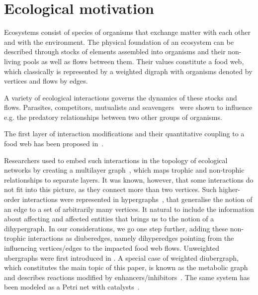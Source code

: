 \documentclass[a4paper,12pt]{article}
\theoremstyle{definition}
\theoremstyle{remark}
\newcommand{\mat}[1]{\todo[inline,color=cMat]{\color{black}#1}}
\newcommand{\adel}[2][]{\deleted[id=Alex,comment=#1]{#2}}
\newcommand{\gadd}[2][]{\added[id=Gokhan,comment=#1]{#2}}
\newcommand{\gdel}[2][]{\deleted[id=Gokhan,comment=#1]{#2}}
\begin{document}
\section{Ecological motivation}


Ecosystems consist of species of organisms that exchange matter with each other and with the environment. The physical foundation of an ecosystem can be described through stocks of elements assembled into organisms and their non-living pools\gadd{,} as well as flows between them. Their values constitute a food web, which classically is represented by a weighted digraph with organisms denoted by vertices and flows by edges. 

A variety of ecological interactions governs the dynamics of these stocks and flows. Parasites, competitors, mutualists\gadd{,} and scavengers~\cite{Moleon_scavenging} were shown to influence e.g.\gadd{,} the predatory relationships between two other groups of organisms. 

The first layer of interaction modifications and their quantitative coupling to a  food web has been proposed in~\cite{Goudard_nontrophic_2008}.

Researchers used to embed such interactions in the topology of ecological networks by creating a multilayer graph~\cite{Pilosof_2015, Lurgi_2020, Hutchinson2019}, which maps trophic and non-trophic relationships to separate layers. It was known, however, that some interactions do not fit into this picture, as they connect more than two vertices. Such higher-order interactions were represented in hypergraphs~\cite{GOLUBSKI2016344, Mayfield2017}, that generalise the notion of an edge to a set of \gdel{an} arbitrarily many vertices. It \gdel{seems also} \gadd{also seems} natural to include the information about affecting and affected entities that brings us to the notion of a dihypergraph. In our considerations, we go one step further, adding these non-trophic interactions as diuberedges, namely dihyperedges pointing from the influencing vertices/edges to the impacted food web flows. %
Unweighted ubergraphs were first introduced in \cite{Joslyn2017UbergraphsAD}. A special case of weighted diubergraph, which constitutes the main topic of this paper, is known as the metabolic graph and describes reactions modified by enhancers/inhibitors~\cite{Metabolic_graphs_McQuade}. The same system has been modeled as a Petri net with catalysts~\cite{Baez_2019_catalysts}. 
\end{document}
